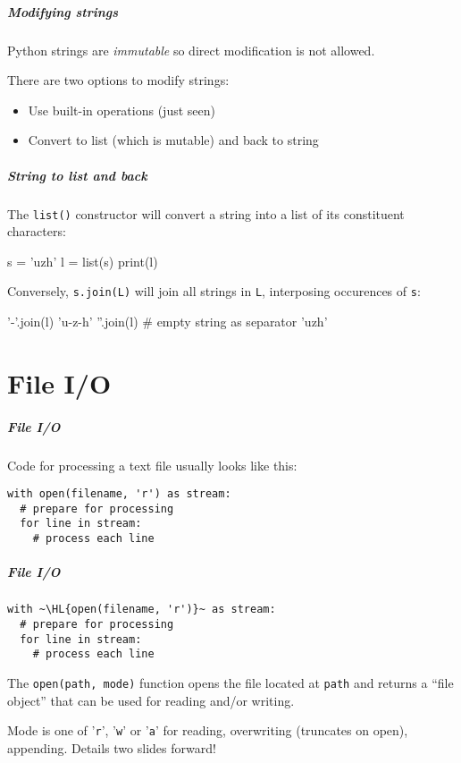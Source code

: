 \documentclass[english,serif,mathserif,xcolor=pdftex,dvipsnames,table]{beamer}
\begin{document}
\begin{frame}
  \frametitle{Modifying strings}
  Python strings are \emph{immutable} so direct modification is not allowed.

  \+
  There are two options to modify strings:
  \begin{itemize}
  \item Use built-in operations (just seen)
  \item Convert to list (which is mutable) and back to string
  \end{itemize}
\end{frame}


\begin{frame}
  \frametitle{String to list and back}
  The \texttt{list()} constructor will convert a string into a list of
  its constituent characters:
\begin{semiverbatim}
\In s = 'uzh'
\In l = list(s)
\In print(l)
\Out ['u', 'z', 'h']
\end{semiverbatim}

  \+
  Conversely, \texttt{s.join(L)} will join all strings in
  \texttt{L}, interposing occurences of \texttt{s}:
\begin{semiverbatim}
\In '-'.join(l)
\Out 'u-z-h'
\In ''.join(l)  # empty string as separator
\Out 'uzh'
\end{semiverbatim}
\end{frame}


\part{File I/O}

\begin{frame}[fragile]
  \frametitle{File I/O}

  Code for processing a text file usually looks like this:
\begin{lstlisting}
with open(filename, 'r') as stream:
  # prepare for processing
  for line in stream:
    # process each line
\end{lstlisting}
\end{frame}


\begin{frame}[fragile]
  \frametitle{File I/O}

\begin{lstlisting}
with ~\HL{open(filename, 'r')}~ as stream:
  # prepare for processing
  for line in stream:
    # process each line
\end{lstlisting}

  \+ The \lstinline|open(path, mode)| function opens the file located at
  \texttt{path} and returns a ``file object'' that can be used for reading
  and/or writing.

  \+ Mode is one of '\texttt{r}', '\texttt{w}' or '\texttt{a}' for reading,
  overwriting (truncates on open), appending. Details two slides forward!
\end{frame}
\end{document}
